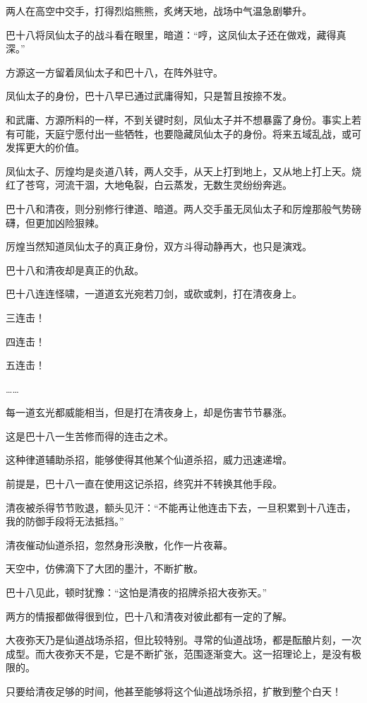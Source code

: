 \begin{this_body}
两人在高空中交手，打得烈焰熊熊，炙烤天地，战场中气温急剧攀升。

巴十八将凤仙太子的战斗看在眼里，暗道：“哼，这凤仙太子还在做戏，藏得真深。”

方源这一方留着凤仙太子和巴十八，在阵外驻守。

凤仙太子的身份，巴十八早已通过武庸得知，只是暂且按捺不发。

和武庸、方源所料的一样，不到关键时刻，凤仙太子并不想暴露了身份。事实上若有可能，天庭宁愿付出一些牺牲，也要隐藏凤仙太子的身份。将来五域乱战，或可发挥更大的价值。

凤仙太子、厉煌均是炎道八转，两人交手，从天上打到地上，又从地上打上天。烧红了苍穹，河流干涸，大地龟裂，白云蒸发，无数生灵纷纷奔逃。

巴十八和清夜，则分别修行律道、暗道。两人交手虽无凤仙太子和厉煌那般气势磅礴，但更加凶险狠辣。

厉煌当然知道凤仙太子的真正身份，双方斗得动静再大，也只是演戏。

巴十八和清夜却是真正的仇敌。

巴十八连连怪啸，一道道玄光宛若刀剑，或砍或刺，打在清夜身上。

三连击！

四连击！

五连击！

……

每一道玄光都威能相当，但是打在清夜身上，却是伤害节节暴涨。

这是巴十八一生苦修而得的连击之术。

这种律道辅助杀招，能够使得其他某个仙道杀招，威力迅速递增。

前提是，巴十八一直在使用这记杀招，终究并不转换其他手段。

清夜被杀得节节败退，额头见汗：“不能再让他连击下去，一旦积累到十八连击，我的防御手段将无法抵挡。”

清夜催动仙道杀招，忽然身形涣散，化作一片夜幕。

天空中，仿佛滴下了大团的墨汁，不断扩散。

巴十八见此，顿时犹豫：“这怕是清夜的招牌杀招大夜弥天。”

两方的情报都做得很到位，巴十八和清夜对彼此都有一定的了解。

大夜弥天乃是仙道战场杀招，但比较特别。寻常的仙道战场，都是酝酿片刻，一次成型。而大夜弥天不是，它是不断扩张，范围逐渐变大。这一招理论上，是没有极限的。

只要给清夜足够的时间，他甚至能够将这个仙道战场杀招，扩散到整个白天！


\end{this_body}
